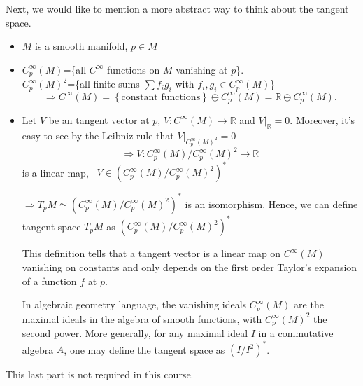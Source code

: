 Next, we would like to mention a more abstract way to think 
about the tangent space.
\begin{itemize}
    \item \(M\) is a smooth manifold, \(p\in M\)
    \item \(C_p^\infty(M)\)=\{all \(C^\infty\) functions
    on \(M\) vanishing at \(p\)\}.\\
    \(C_p^\infty(M)^2\)=\{all finite sums 
    \(\sum f_i g_i \) with \(f_i,g_i\in C_p^\infty(M)\)\}
    \[
        \Rightarrow C^\infty(M)=
        \left\{\text{constant functions}\right\}\oplus 
        C^\infty_p(M)=\mathbb{R}\oplus C^\infty_p(M).     
    \]
    \item Let \(V\) be an tangent vector at \(p\), 
    \(V\colon C^\infty(M)\to \mathbb{R}\) and \(V|_{\mathbb{R}}=0\).
    Moreover, it's easy to see by the Leibniz rule that 
    \(V|_{C_p^\infty(M)^2}=0\)
    \[
          \Rightarrow V\colon C_p^\infty(M)/C_p^\infty(M)^2
          \to \mathbb{R}
    \]
    is a linear map, \ie\ \(V\in 
    \left(C_p^\infty(M)/C_p^\infty(M)^2\right)^*\)

    \(\Rightarrow T_p M\simeq 
    \left(C_p^\infty(M)/C_p^\infty(M)^2\right)^*\)
    is an isomorphism. Hence, we can define tangent space
    \(T_p M\) as 
    \(\left(C_p^\infty(M)/C_p^\infty(M)^2\right)^*\)

    This definition tells that a tangent vector is a linear map 
    on \(C^\infty(M)\) vanishing on constants and only depends 
    on the first order Taylor's expansion of a function \(f\)
    at \(p\).

    In algebraic geometry language, the vanishing ideals 
    \(C^\infty_p(M)\) are the maximal ideals in the algebra
     of smooth functions, with \(C_p^\infty(M)^2\) the second
     power. More generally, for any maximal ideal \(I\) in a 
     commutative algebra \(A\), one may define the tangent space as 
    \(\left(I/I^2\right)^*\).
\end{itemize}
\begin{remark}
    This last part is not required in this course.
\end{remark}
